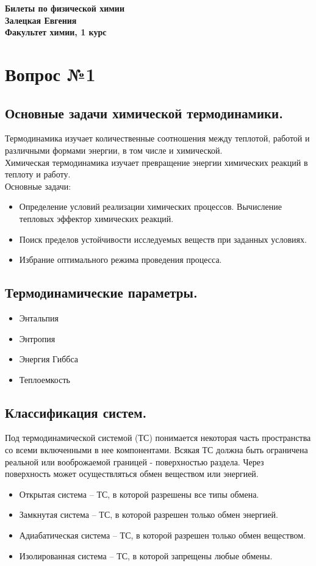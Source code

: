 \documentclass[14pt,a4paper]{scrartcl}
\begin{document}
	\begin{flushright}
	\textbf{Билеты по физической химии\\
		Залецкая Евгения \\
		Факультет химии, 1 курс}
\end{flushright}  	
\section*{Вопрос №1}
	
	\subsection*{Основные задачи химической термодинамики.} 
	Термодинамика изучает количественные соотношения между
	теплотой, работой и различными формами энергии, в том числе
	и химической. \\
	Химическая термодинамика изучает превращение энергии
	химических реакций в теплоту и работу. \\
	Основные задачи:
	\begin{itemize}
		\item Определение условий реализации химических процессов. Вычисление тепловых эффектор химических реакций.
		\item Поиск пределов устойчивости исследуемых веществ при заданных условиях.
		\item Избрание оптимального режима проведения процесса.	
	\end{itemize}
	
	\subsection*{Термодинамические параметры.} 
	\begin{itemize}
		\item Энтальпия
		\item Энтропия
		\item Энергия Гиббса
		\item Теплоемкость
	\end{itemize}
	
	\subsection*{Классификация систем.} 
	Под термодинамической системой (ТС) понимается некоторая часть пространства со всеми включенными в нее компонентами. Всякая ТС должна быть ограничена реальной или вооброжаемой границей - поверхностью раздела. Через поверхность может осуществляться обмен веществом или энергией.
	\begin{itemize}
		\item Открытая система -- ТС, в которой разрешены все типы обмена.
		\item Замкнутая система -- ТС, в которой разрешен только обмен энергией.
		\item Адиабатическая система -- ТС, в которой разрешен только обмен веществом.
		\item Изолированная система -- ТС, в которой запрещены любые обмены.
	\end{itemize}
	
\end{document}
